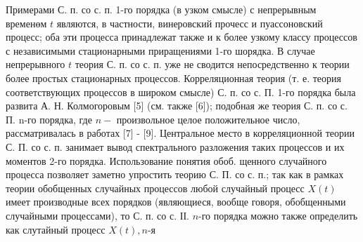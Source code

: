 \documentclass[10pt]{article}
\begin{document}
Примерами С. п. со с. п. 1-го порядка (в узком смысле) с непрерывным временөм $t$ являются, в частности, винеровский прочесс и пуассоновский процесс; оба эти процесса принадлежат также и к более узкому классу процессов с независимыми стационарными приращениями 1-го шорядка. В случае непрерывного $t$ теория С. п. со с. п. уже не сводится непосредственно к теории более простых стационарных процессов. Корреляционная теория (т. е. теория соответствующих процессов в широком смысле) С. п. со с. П. 1-го порядка была развита А. Н. Колмогоровым [5] (см. также [6]); подобная же теория С. п. со с. П. n-го порядка, где $n-$ произвольное целое положительное число, рассматривалась в работах [7] - [9]. Центральное место в корреляционной теории С. П. со с. п. занимает вывод спектрального разложения таких процессов и их моментов 2-го порядка. Использование понятия обоб. щенного случайного процесса позволяет заметно упростить теорию С. П. со с. п.; так как в рамках теории обобщенных случайных процессов любой случайный процесс $X(t)$ имеет производные всех порядков (являющиеся, вообще говоря, обобщенными случайными процессами), то С. п. со с. ІІ. $n$-го порядка можно также определить как слутайный процесс $X(t), n$-я
\end{document}
